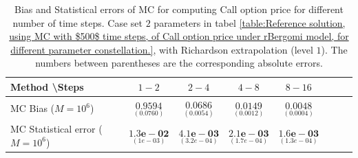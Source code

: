 \documentclass[11pt]{article}
\begin{document}
\begin{table}[h!]
	\centering
	\begin{tabular}{l*{6}{c}r}
		Method \textbackslash  Steps            & $1-2$ & $2-4$ & $4-8$ & $8-16$  \\
		\hline
		MC Bias ($M=10^6$)  &$\underset{( 0.0760)}{\mathbf{0.9594}}$  & $\underset{( 0.0054)}{\mathbf{0.0686}}$  & $\underset{(   0.0012)}{\mathbf{0.0149}}$  & $\underset{(  0.0004)}{\mathbf{0.0048}}$ \\	
		
		MC Statistical error ($M=10^6$)   & $\underset{( 1e-03)}{\mathbf{1.3e-02}}$  & $\underset{(   3.2e-04)}{\mathbf{4.1e-03}}$  & $\underset{(  1.7e-04)}{\mathbf{2.1e-03}}$ & $\underset{(  1.3e-04)}{\mathbf{1.6e-03}}$ \\	
		
		
		
 
			
		\hline
	\end{tabular}
	\caption{Bias and Statistical errors of MC   for computing Call option price  for different number of time steps. Case set $2$ parameters in tabel \ref{table:Reference solution, using MC with $500$ time steps, of Call option price under rBergomi model, for different parameter constellation.}, with Richardson extrapolation (level $1$). The numbers between parentheses are the corresponding absolute errors.}
	\label{Bias and Statistical errors of MC ($M=10^6$)  for computing Call option price  for different number of time steps. Case set $2$ parameters, with Richardson extrapolation (level1). The numbers between parentheses are the corresponding absolute errors.}
\end{table}
\end{document}
